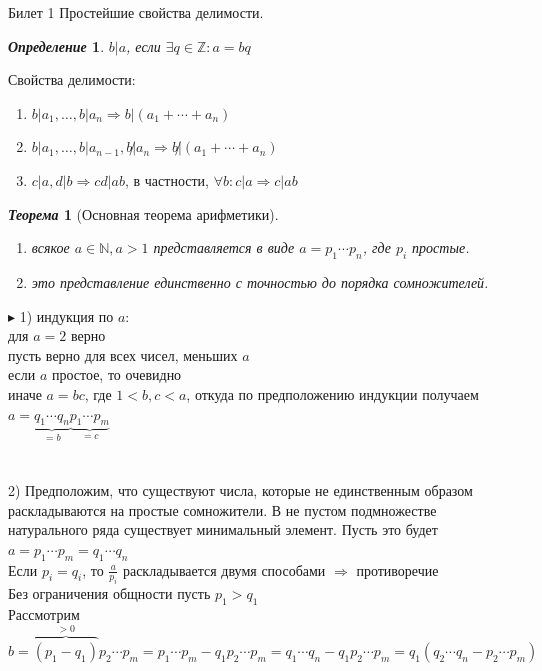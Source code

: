 \documentclass[a4paper,12pt]{article}
\newtheorem{deff}{\textit{Определение}}
\newtheorem{teo}{\textit{Теорема}}
\newcommand{\q}{\quad}
\newcommand{\pb}{\blacktriangleright}
\newcommand{\bb}[1]{\mathbb{#1}}
\begin{document}
\newpage
\begin{mybox}{\hypertarget{bil1}{Билет 1}}
{}
Простейшие свойства делимости.
\begin{deff} $b|a$, если $\exists q\in \mathbb{Z}: a=bq$
\end{deff}
Свойства делимости:
\begin{enumerate}
    \item $b|a_1, \dots, b|a_n \Rightarrow b|(a_1+\cdots+a_n)$
    \item $b|a_1, \dots, b|a_{n-1}, b\not|a_n \Rightarrow b\not|(a_1+\cdots+a_n)$
    \item $c|a, d|b \Rightarrow cd|ab$, в частности, $\forall b: c|a \Rightarrow c|ab$
\end{enumerate}
\begin{teo}[Основная теорема арифметики]\q\\
\begin{enumerate}
    \item всякое $a \in \bb{N}, a > 1$ представляется в виде $a = p_1\cdots p_n$, где $p_i$ простые.
    \item это представление единственно с точностью до порядка сомножителей.
\end{enumerate}
\end{teo}
$\pb$ 1) индукция по $a$:\\
для $a = 2$ верно\\
пусть верно для всех чисел, меньших $a$\\
если $a$ простое, то очевидно\\
иначе $a = bc$, где $1<b,c<a$, откуда по предположению индукции получаем $a = \underbrace{q_1\cdots q_n}_{=b} \underbrace{p_1\cdots p_m}_{=c}$\\\q\\\q\\
2) Предположим, что существуют числа, которые не единственным образом раскладываются на простые сомножители. В не пустом подмножестве натурального ряда существует минимальный элемент. Пусть это будет $a = p_1\cdots p_m = q_1\cdots q_n$\\
Если $p_i = q_i$, то $\frac{a}{p_i}$ раскладывается двумя способами $\Rightarrow$ противоречие\\
Без ограничения общности пусть $p_1 > q_1$\\
Рассмотрим $b = \overbrace{(p_1 - q_1)}^{>0}p_2\cdots p_m = p_1\cdots p_m - q_1p_2\cdots p_m = q_1\cdots q_n - q_1 p_2\cdots p_m = q_1 (q_2 \cdots q_n - p_2\cdots p_m)$\\

\end{mybox}
\end{document}
